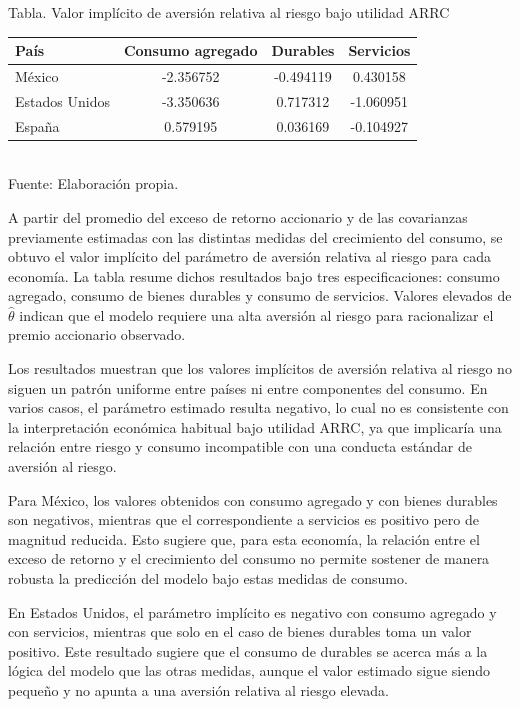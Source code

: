 \documentclass{article}\usepackage[]{graphicx}\usepackage[]{xcolor}
\begin{document}
\begin{center}
Tabla. Valor implícito de aversión relativa al riesgo bajo utilidad ARRC
\end{center}
\begin{center}

\begin{tabular}{lccc}
\toprule
País & Consumo agregado & Durables & Servicios\\
\midrule
México & -2.356752 & -0.494119 & 0.430158\\
Estados Unidos & -3.350636 & 0.717312 & -1.060951\\
España & 0.579195 & 0.036169 & -0.104927\\
\bottomrule
\end{tabular}
\\[0.3em]
{\footnotesize Fuente: Elaboración propia.}
\end{center}


A partir del promedio del exceso de retorno accionario y de las covarianzas previamente estimadas con las distintas medidas del crecimiento del consumo, se obtuvo el valor implícito del parámetro de aversión relativa al riesgo para cada economía. La tabla resume dichos resultados bajo tres especificaciones: consumo agregado, consumo de bienes durables y consumo de servicios. Valores elevados de \(\hat{\theta}\) indican que el modelo requiere una alta aversión al riesgo para racionalizar el premio accionario observado.

Los resultados muestran que los valores implícitos de aversión relativa al riesgo no siguen un patrón uniforme entre países ni entre componentes del consumo. En varios casos, el parámetro estimado resulta negativo, lo cual no es consistente con la interpretación económica habitual bajo utilidad ARRC, ya que implicaría una relación entre riesgo y consumo incompatible con una conducta estándar de aversión al riesgo.

Para México, los valores obtenidos con consumo agregado y con bienes durables son negativos, mientras que el correspondiente a servicios es positivo pero de magnitud reducida. Esto sugiere que, para esta economía, la relación entre el exceso de retorno y el crecimiento del consumo no permite sostener de manera robusta la predicción del modelo bajo estas medidas de consumo.

En Estados Unidos, el parámetro implícito es negativo con consumo agregado y con servicios, mientras que solo en el caso de bienes durables toma un valor positivo. Este resultado sugiere que el consumo de durables se acerca más a la lógica del modelo que las otras medidas, aunque el valor estimado sigue siendo pequeño y no apunta a una aversión relativa al riesgo elevada.
\end{document}

